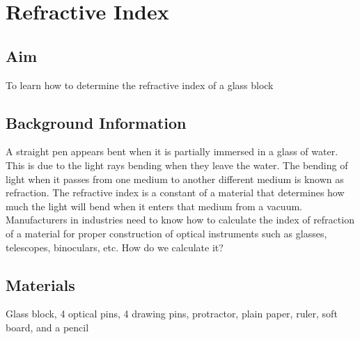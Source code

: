 \chapter{Refractive Index}

\section{Aim}
To learn how to determine the refractive index of a glass block

\section{Background Information}
A straight pen appears bent when it is partially immersed in a glass of water. This is due to the light rays bending when they leave the water. The bending of light when it passes from one medium to another different medium is known as refraction. The refractive index is a constant of a material that determines how much the light will bend when it enters that medium from a vacuum. Manufacturers in industries need to know how to calculate the index of refraction of a material for proper construction of optical instruments such as glasses, telescopes, binoculars, etc. How do we calculate it?

\section{Materials}
Glass block, 4 optical pins, 4 drawing pins, protractor, plain paper, ruler, soft board, and a pencil

